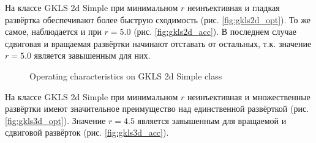 \documentclass[runningheads]{llncs}
\begin{document}
На классе GKLS 2d Simple при минимальном \(r\) неинъективная и гладкая развёртка обеспечивают более быструю сходимость (рис. \ref{fig:gkls2d_opt}). То же самое, наблюдается и при \(r=5.0\) (рис. \ref{fig:gkls2d_acc}). В последнем случае сдвиговая и вращаемая развёртки начинают отставать от остальных, т.к. значение \(r=5.0\) является завышенным для них.
\begin{figure}[ht]
    \centering
    \caption{Operating characteristics on GKLS 2d Simple class}
\end{figure}

На классе GKLS 2d Simple при минимальном \(r\) неинъективная и множественные развёртки имеют значительное преимущество над единственной развёрткой (рис. \ref{fig:gkls3d_opt}). Значение \(r=4.5\) является завышенным для вращаемой и сдвиговой развёрток (рис. \ref{fig:gkls3d_acc}).
\end{document}
